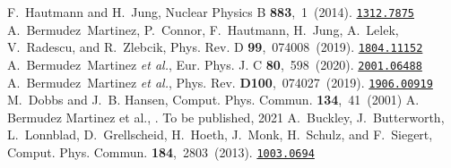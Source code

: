 \documentclass[11pt]{article} \usepackage{mystyle-new}
\begin{document}
\begin{mcbibliography}{10}
F.~Hautmann and H.~Jung,
\newblock Nuclear Physics B{} {\bf 883},~1~(2014).
\newblock \href{http://www.arXiv.org/abs/1312.7875}{{\tt 1312.7875}}\relax
\relax
{}
A.~Bermudez~Martinez, P.~Connor, F.~Hautmann, H.~Jung, A.~Lelek, V.~Radescu,
  and R.~Zlebcik,
\newblock Phys. Rev. D{} {\bf 99},~074008~(2019).
\newblock \href{http://www.arXiv.org/abs/1804.11152}{{\tt 1804.11152}}\relax
\relax
{}
A.~Bermudez~Martinez {\em et al.},
\newblock Eur. Phys. J. C{} {\bf 80},~598~(2020).
\newblock \href{http://www.arXiv.org/abs/2001.06488}{{\tt 2001.06488}}\relax
\relax
{}
A.~Bermudez~Martinez {\em et al.},
\newblock Phys. Rev.{} {\bf D100},~074027~(2019).
\newblock \href{http://www.arXiv.org/abs/1906.00919}{{\tt 1906.00919}}\relax
\relax
{}
M.~Dobbs and J.~B. Hansen,
\newblock Comput. Phys. Commun.{} {\bf 134},~41~(2001)\relax
\relax
{}
{A. Bermudez Martinez et al.},
.
\newblock To be published, 2021\relax
\relax
{}
A.~Buckley, J.~Butterworth, L.~Lonnblad, D.~Grellscheid, H.~Hoeth, J.~Monk,
  H.~Schulz, and F.~Siegert,
\newblock Comput. Phys. Commun.{} {\bf 184},~2803~(2013).
\newblock \href{http://www.arXiv.org/abs/1003.0694}{{\tt 1003.0694}}\relax
\relax
\end{mcbibliography}
\end{document}
